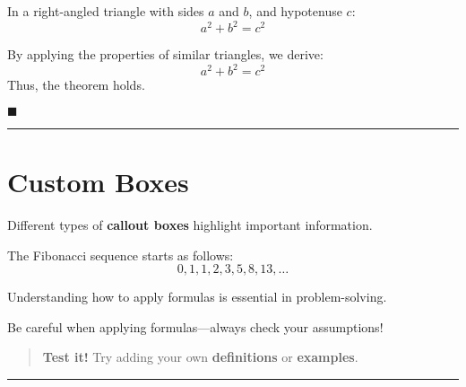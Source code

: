 \documentclass[
  14pt,
  a4paper,
]{extarticle}
\renewenvironment{proof}{%
   \par\noindent{\color{nmuprimaryblue}\addfontfeatures{Weight=700}Proof:}\normalfont}{%
   \hfill$\blacksquare$\par}
\begin{document}
\begin{theorem}\label{thm:pythagoras}

In a right-angled triangle with sides \(a\) and \(b\), and hypotenuse
\(c\): \[
a^2 + b^2 = c^2
\]

\end{theorem}

\begin{proof}

By applying the properties of similar triangles, we derive: \[
a^2 + b^2 = c^2
\] Thus, the theorem holds.

\end{proof}

\begin{center}\rule{0.5\linewidth}{0.5pt}\end{center}

\section{\texorpdfstring{ \textbf{Custom
Boxes}}{ Custom Boxes}}\label{custom-boxes}

Different types of \textbf{callout boxes} highlight important
information.

\begin{examplebox}[Example]

The Fibonacci sequence starts as follows: \[
0, 1, 1, 2, 3, 5, 8, 13, \dots
\]

\end{examplebox}

\begin{importantbox}[Important]

Understanding how to apply formulas is essential in problem-solving.

\end{importantbox}

\begin{warningbox}[Warning]

Be careful when applying formulas---always check your assumptions!

\end{warningbox}

\begin{quote}
 \textbf{Test it!} Try adding your own
\textbf{definitions} or \textbf{examples}.
\end{quote}

\begin{center}\rule{0.5\linewidth}{0.5pt}\end{center}
\end{document}
